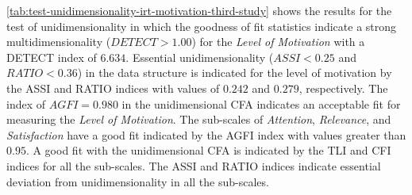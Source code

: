 \autoref{tab:test-unidimensionality-irt-motivation-third-study} shows the results for the test of unidimensionality in which the goodness of fit statistics indicate a strong multidimensionality ($DETECT > 1.00$) for the \emph{Level of Motivation} with a DETECT index of $6.634$.
Essential unidimensionality ($ASSI < 0.25$ and $RATIO < 0.36$) in the data structure is indicated for the level of motivation by the ASSI and RATIO indices with values of $0.242$ and $0.279$, respectively.
The index of $AGFI = 0.980$ in the unidimensional CFA indicates an acceptable fit for measuring the \emph{Level of Motivation}.
The sub-scales of \emph{Attention}, \emph{Relevance}, and \emph{Satisfaction} have a good fit indicated by the AGFI index with values greater than $0.95$.
A good fit with the unidimensional CFA is indicated by the TLI and CFI indices for all the sub-scales.
The ASSI and RATIO indices indicate essential deviation from unidimensionality in all the sub-scales.


